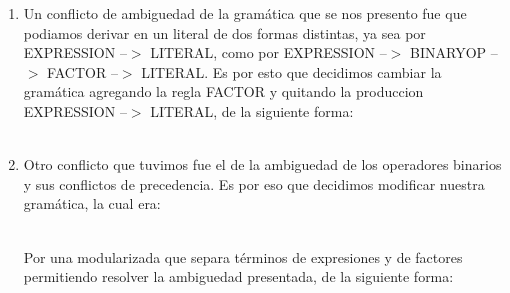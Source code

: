 \begin{enumerate}
\begin{reglas}
    \\
    \\
    \\
 
\end{reglas}

\item Un conflicto de ambiguedad de la gramática que se nos presento fue que
  podiamos derivar en un literal de dos formas distintas, ya sea por EXPRESSION
  --$>$ LITERAL, como por EXPRESSION --$>$ BINARYOP --$>$ FACTOR --$>$ LITERAL. Es por esto que decidimos cambiar la
  gramática agregando la regla FACTOR y quitando la produccion EXPRESSION --$>$
  LITERAL, de la siguiente forma:
  \\
  \\
  \begin{reglas} 
  \end{reglas}

\item Otro conflicto que tuvimos fue el de la ambiguedad de los operadores
  binarios y sus conflictos de precedencia. Es por eso que decidimos modificar
  nuestra gramática, la cual era:

  \begin{reglas}
  \end{reglas}
    \\
    Por una modularizada que separa términos de expresiones y de factores
    permitiendo resolver la ambiguedad presentada, de la siguiente forma:
    \\
  \begin{reglas}
    \\
    \\ 
  \end{reglas}
\end{enumerate}




